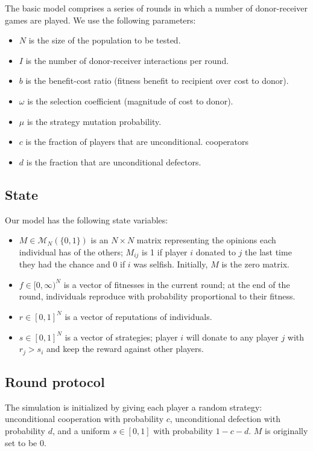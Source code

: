 \documentclass{amsart}
\begin{document}
The basic model comprises a series of rounds in which a number of
donor-receiver games are played. We use the following parameters:

\begin{itemize}
\item $N$ is the size of the population to be tested.
\item $I$ is the number of donor-receiver interactions per round.
\item $b$ is the benefit-cost ratio (fitness benefit to recipient over
  cost to donor).
\item $\omega$ is the selection coefficient (magnitude of cost to
  donor).
\item $\mu$ is the strategy mutation probability.
\item $c$ is the fraction of players that are unconditional.
  cooperators
\item $d$ is the fraction that are unconditional defectors.
\end{itemize}

\subsection{State}

Our model has the following state variables:

\begin{itemize}
\item $M \in \mathcal{M}_N(\{0,1\})$ is an $N \times N$ matrix
  representing the opinions each individual has of the others;
  $M_{ij}$ is 1 if player $i$ donated to $j$ the last time they had
  the chance and 0 if $i$ was selfish. Initially, $M$ is the zero
  matrix.
\item $f \in [0, \infty)^N$ is a vector of fitnesses in the current
  round; at the end of the round, individuals reproduce with
  probability proportional to their fitness.
\item $r \in [0,1]^N$ is a vector of reputations of individuals.
\item $s \in [0,1]^N$ is a vector of strategies; player $i$ will
  donate to any player $j$ with $r_j > s_i$ and keep the reward
  against other players.
\end{itemize}

\subsection{Round protocol}
The simulation is initialized by giving each player a random strategy:
unconditional cooperation with probability $c$, unconditional
defection with probability $d$, and a uniform $s \in [0,1]$ with
probability $1 - c- d$. $M$ is originally set to be $0$.
\end{document}
